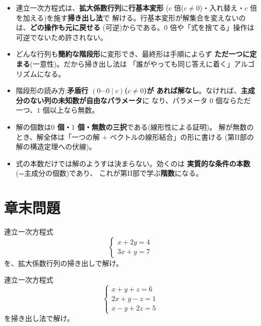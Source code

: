 \begin{matome}
\begin{itemize}
\item 連立一次方程式は、\textbf{拡大係数行列}に\textbf{行基本変形}
($c$ 倍($c \neq 0$)・入れ替え・$c$ 倍を加える)を施す\textbf{掃き出し法}で
解ける。行基本変形が解集合を変えないのは、\textbf{どの操作も元に戻せる}
(可逆)からである。$0$ 倍や「式を捨てる」操作は可逆でないため許されない。
\item どんな行列も\textbf{簡約な階段形}に変形でき、最終形は手順によらず
\textbf{ただ一つに定まる}(一意性)。だから掃き出し法は
「誰がやっても同じ答えに着く」アルゴリズムになる。
\item 階段形の読み方:\textbf{矛盾行 $(0 \cdots 0 \mid c)$($c \neq 0$)が
あれば解なし}。なければ、\textbf{主成分のない列の未知数が自由なパラメータ}に
なり、パラメータ $0$ 個ならただ一つ、$1$ 個以上なら無数。
\item 解の個数は\textbf{$0$ 個・$1$ 個・無数の三択}である(線形性による証明)。
解が無数のとき、解全体は「一つの解 $+$ ベクトルの線形結合」の形に書ける
(第II部の解の構造定理への伏線)。
\item 式の本数だけでは解のようすは決まらない。効くのは
\textbf{実質的な条件の本数}(=主成分の個数)であり、
これが第II部で学ぶ\textbf{階数}になる。
\end{itemize}
\end{matome}

\section*{章末問題}

\begin{mondai}[基本]\label{q:gauss-ex1}
連立一次方程式
\[
\begin{cases}
x + 2y = 4 \\
3x + y = 7
\end{cases}
\]
を、拡大係数行列の掃き出しで解け。
\end{mondai}

\begin{mondai}[基本]\label{q:gauss-ex2}
連立一次方程式
\[
\begin{cases}
x + y + z = 6 \\
2x + y - z = 1 \\
x - y + 2z = 5
\end{cases}
\]
を掃き出し法で解け。
\end{mondai}

